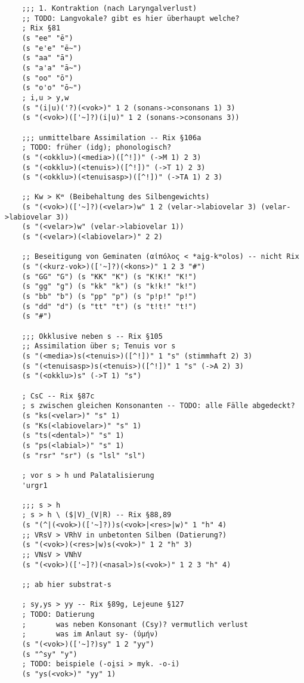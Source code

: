 \begin{verbatim}
    ;;; 1. Kontraktion (nach Laryngalverlust)
    ;; TODO: Langvokale? gibt es hier überhaupt welche?
    ; Rix §81
    (s "ee" "ē")
    (s "e'e" "ē~")
    (s "aa" "ā")
    (s "a'a" "ā~")
    (s "oo" "ō")
    (s "o'o" "ō~")
    ; i,u > y,w
    (s "(i|u)('?)(<vok>)" 1 2 (sonans->consonans 1) 3)
    (s "(<vok>)(['~]?)(i|u)" 1 2 (sonans->consonans 3))

    ;;; unmittelbare Assimilation -- Rix §106a
    ; TODO: früher (idg); phonologisch?
    (s "(<okklu>)(<media>)([^!])" (->M 1) 2 3)
    (s "(<okklu>)(<tenuis>)([^!])" (->T 1) 2 3)
    (s "(<okklu>)(<tenuisasp>)([^!])" (->TA 1) 2 3)

    ;; Kw > Kʷ (Beibehaltung des Silbengewichts)
    (s "(<vok>)(['~]?)(<velar>)w" 1 2 (velar->labiovelar 3) (velar->labiovelar 3))
    (s "(<velar>)w" (velar->labiovelar 1))
    (s "(<velar>)(<labiovelar>)" 2 2)

    ;; Beseitigung von Geminaten (αἰπόλος < *ai̯g-kʷolos) -- nicht Rix
    (s "(<kurz-vok>)(['~]?)(<kons>)" 1 2 3 "#")
    (s "GG" "G") (s "KK" "K") (s "K!K!" "K!")
    (s "gg" "g") (s "kk" "k") (s "k!k!" "k!")
    (s "bb" "b") (s "pp" "p") (s "p!p!" "p!")
    (s "dd" "d") (s "tt" "t") (s "t!t!" "t!")
    (s "#")

    ;;; Okklusive neben s -- Rix §105
    ;; Assimilation über s; Tenuis vor s
    (s "(<media>)s(<tenuis>)([^!])" 1 "s" (stimmhaft 2) 3)
    (s "(<tenuisasp>)s(<tenuis>)([^!])" 1 "s" (->A 2) 3)
    (s "(<okklu>)s" (->T 1) "s")

    ; CsC -- Rix §87c
    ; s zwischen gleichen Konsonanten -- TODO: alle Fälle abgedeckt?
    (s "ks(<velar>)" "s" 1)
    (s "Ks(<labiovelar>)" "s" 1)
    (s "ts(<dental>)" "s" 1)
    (s "ps(<labial>)" "s" 1)
    (s "rsr" "sr") (s "lsl" "sl")

    ; vor s > h und Palatalisierung
    'urgr1

    ;;; s > h
    ; s > h \ ($|V)_(V|R) -- Rix §88,89
    (s "(^|(<vok>)(['~]?))s(<vok>|<res>|w)" 1 "h" 4)
    ;; VRsV > VRhV in unbetonten Silben (Datierung?)
    (s "(<vok>)(<res>|w)s(<vok>)" 1 2 "h" 3)
    ;; VNsV > VNhV
    (s "(<vok>)(['~]?)(<nasal>)s(<vok>)" 1 2 3 "h" 4)

    ;; ab hier substrat-s

    ; sy,ys > yy -- Rix §89g, Lejeune §127
    ; TODO: Datierung
    ;       was neben Konsonant (Csy)? vermutlich verlust
    ;       was im Anlaut sy- (ὑμήν)
    (s "(<vok>)(['~]?)sy" 1 2 "yy")
    (s "^sy" "y")
    ; TODO: beispiele (-oi̯si > myk. -o-i)
    (s "ys(<vok>)" "yy" 1)


\end{verbatim}
